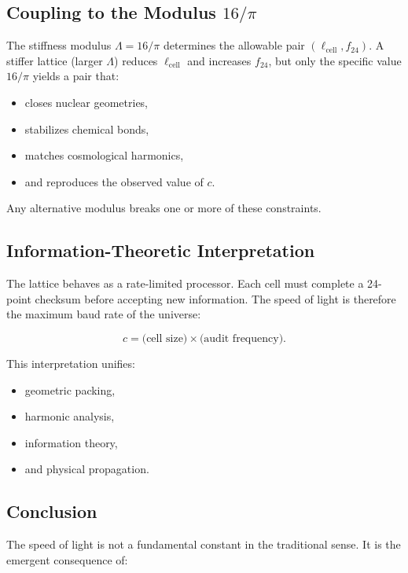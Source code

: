 \documentclass[12pt,oneside]{book}
\begin{document}
\subsection{Coupling to the Modulus \(16/\pi\)}

The stiffness modulus \(\Lambda = 16/\pi\) determines the allowable pair \((\ell_{\text{cell}}, f_{24})\).
A stiffer lattice (larger \(\Lambda\)) reduces \(\ell_{\text{cell}}\) and increases \(f_{24}\), but only the
specific value \(16/\pi\) yields a pair that:

\begin{itemize}
    \item closes nuclear geometries,
    \item stabilizes chemical bonds,
    \item matches cosmological harmonics,
    \item and reproduces the observed value of \(c\).
\end{itemize}

Any alternative modulus breaks one or more of these constraints.

\subsection{Information-Theoretic Interpretation}

The lattice behaves as a rate-limited processor. Each cell must complete a 24-point
checksum before accepting new information. The speed of light is therefore the maximum
baud rate of the universe:


\[
c = \text{(cell size)} \times \text{(audit frequency)}.
\]



This interpretation unifies:
\begin{itemize}
    \item geometric packing,
    \item harmonic analysis,
    \item information theory,
    \item and physical propagation.
\end{itemize}

\subsection{Conclusion}

The speed of light is not a fundamental constant in the traditional sense. It is the
emergent consequence of:
\end{document}
